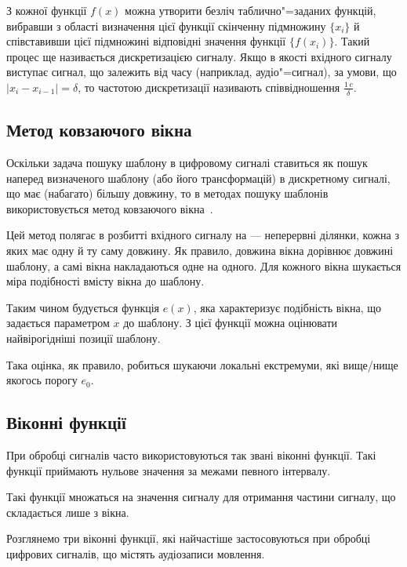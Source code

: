     З кожної функції $f(x)$ можна утворити безліч таблично"=заданих функцій, вибравши з області визначення цієї
    функції скінченну підмножину $\{x_i\}$ й співставивши цієї підмножині відповідні значення функції $\{f(x_i)\}$.
    Такий процес ще називається дискретизацією сигналу.
    Якщо в якості вхідного сигналу виступає сигнал, що залежить від часу (наприклад, аудіо"=сигнал), за умови, що $|
    x_i - x_{i-1}| = \delta$, то частотою дискретизації називають співвідношення $\frac{1\,c}{\delta}$.

    \subsection{Метод ковзаючого вікна}
    \label{ss:sliding-window}
        Оскільки задача пошуку шаблону в цифровому сигналі ставиться як пошук наперед визначеного шаблону (або його
        трансформацій) в дискретному сигналі, що має (набагато) більшу довжину, то в методах пошуку шаблонів
        використовується метод ковзаючого вікна~\cite{book5}.

        Цей метод полягає в розбитті вхідного сигналу на  --- неперервні ділянки, кожна з яких має
        одну й ту саму довжину.
        Як правило, довжина вікна дорівнює довжині шаблону, а самі вікна накладаються одне на одного.
        Для кожного вікна шукається міра подібності вмісту вікна до шаблону.

        Таким чином будується функція $e(x)$, яка характеризує подібність вікна, що задається параметром $x$ до
        шаблону.
        З цієї функції можна оцінювати найвірогідніші позиції шаблону.

        Така оцінка, як правило, робиться шукаючи локальні екстремуми, які вище/нище якогось порогу $e_{0}$.

    \subsection{Віконні функції}
    \label{ss:window-functions}
        При обробці сигналів часто використовуються так звані віконні функції.
        Такі функції приймають нульове значення за межами певного інтервалу.

        Такі функції множаться на значення сигналу для отримання частини сигналу, що складається лише з вікна.

        Розглянемо три віконні функції, які найчастіше застосовуються при обробці цифрових сигналів, що містять
        аудіозаписи мовлення.

